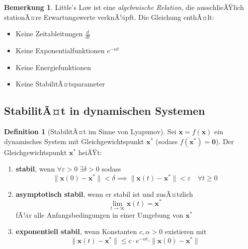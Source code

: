 ﻿\documentclass[a4paper,12pt]{report}
\theoremstyle{definition}
\newtheorem{definition}{Definition}[section]
\newtheorem{bemerkung}{Bemerkung}[section]
\begin{document}
\begin{bemerkung}
	Little's Law ist eine \textit{algebraische Relation}, die ausschlieÃŸlich stationÃ¤re Erwartungswerte verknÃ¼pft. Die Gleichung enthÃ¤lt:
	\begin{itemize}
		\item[-] Keine Zeitableitungen $\frac{d}{dt}$
		\item[-] Keine Exponentialfunktionen $e^{-\alpha t}$
		\item[-] Keine Energiefunktionen
		\item[-] Keine StabilitÃ¤tsparameter
	\end{itemize}
\end{bemerkung}

\subsection{StabilitÃ¤t in dynamischen Systemen}

\begin{definition}[StabilitÃ¤t im Sinne von Lyapunov]
\label{def:stabilitaet}
	Sei $\dot{\mathbf{x}} = f(\mathbf{x})$ ein dynamisches System mit Gleichgewichtspunkt $\mathbf{x}^*$ (sodass $f(\mathbf{x}^*) = \mathbf{0}$). Der Gleichgewichtspunkt $\mathbf{x}^*$ heiÃŸt:
	\begin{enumerate}
		\item[-] \textbf{stabil}, wenn $\forall \varepsilon > 0 \; \exists \delta > 0$ sodass
		\begin{equation}
			\|\mathbf{x}(0) - \mathbf{x}^*\| < \delta \implies \|\mathbf{x}(t) - \mathbf{x}^*\| < \varepsilon \quad \forall t \geq 0
		\end{equation}
		
		\item[-] \textbf{asymptotisch stabil}, wenn er stabil ist und zusÃ¤tzlich
		\begin{equation}
			\lim_{t \to \infty} \mathbf{x}(t) = \mathbf{x}^* 
		\end{equation}
		fÃ¼r alle Anfangsbedingungen in einer Umgebung von $\mathbf{x}^*$
		
		\item[-] \textbf{exponentiell stabil}, wenn Konstanten $c, \alpha > 0$ existieren mit
		\begin{equation}
			\|\mathbf{x}(t) - \mathbf{x}^*\| \leq c \cdot e^{-\alpha t} \cdot \|\mathbf{x}(0) - \mathbf{x}^*\|
		\end{equation}
	\end{enumerate}
\end{definition}
\end{document}
